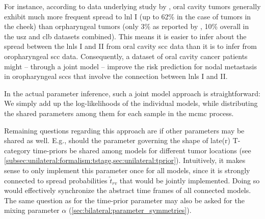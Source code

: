 \documentclass[\relativeRoot/main.tex]{subfiles}
\begin{document}
For instance, according to data underlying study by , oral cavity tumors generally exhibit much more frequent spread to \gls{lnl} I (up to 62\% in the case of tumors in the cheek) than orpharyngeal tumors (only 3\% as reported by , 10\% overall in the \gls{usz} and \gls{clb} datasets combined). This means it is easier to infer about the spread between the \glspl{lnl} I and II from oral cavity \gls{scc} data than it is to infer from oropharyngeal \gls{scc} data. Consequently, a dataset of oral cavity cancer patients might -- through a joint model -- improve the risk prediction for nodal metastasis in oropharyngeal \glspl{scc} that involve the connection between \glspl{lnl} I and II.

In the actual parameter inference, such a joint model approach is straightforward: We simply add up the log-likelihoods of the individual models, while distributing the shared parameters among them for each sample in the \gls{mcmc} process.

Remaining questions regarding this approach are if other parameters may be shared as well. E.g., should the parameter governing the shape of late(r) T-category time-priors be shared among models for different tumor locations (see \cref{subsec:unilateral:formalism:tstage,sec:unilateral:tprior}). Intuitively, it makes sense to only implement this parameter once for all models, since it is strongly connected to spread probabilities $\tilde{t}_{rv}$ that would be jointly implemented. Doing so would effectively synchronize the abstract time frames of all connected models. The same question as for the time-prior parameter may also be asked for the mixing parameter $\alpha$ (\cref{sec:bilateral:parameter_symmetries}).
\end{document}
